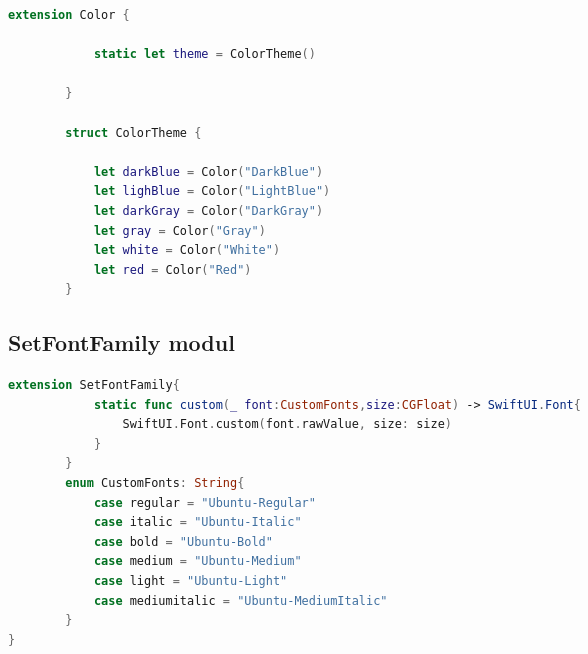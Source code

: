 \begin{spacing}{2}
\end{spacing}
\begin{minipage}{\textwidth}
    \linespread{0.8}\selectfont
    \begin{lstlisting}[language=swift]
        extension Color {
            
            static let theme = ColorTheme()
            
        }

        struct ColorTheme {
            
            let darkBlue = Color("DarkBlue")
            let lighBlue = Color("LightBlue")
            let darkGray = Color("DarkGray")
            let gray = Color("Gray")
            let white = Color("White")
            let red = Color("Red")
        }
    \end{lstlisting}   
\end{minipage}

\subsection*{SetFontFamily modul}

\begin{spacing}{2}
\end{spacing}
\begin{minipage}{\textwidth}
    \linespread{0.8}\selectfont
    \begin{lstlisting}[language=swift]
        extension SetFontFamily{
            static func custom(_ font:CustomFonts,size:CGFloat) -> SwiftUI.Font{
                SwiftUI.Font.custom(font.rawValue, size: size)
            }
        }
        enum CustomFonts: String{
            case regular = "Ubuntu-Regular"
            case italic = "Ubuntu-Italic"
            case bold = "Ubuntu-Bold"
            case medium = "Ubuntu-Medium"
            case light = "Ubuntu-Light"
            case mediumitalic = "Ubuntu-MediumItalic"
        }
}
\end{lstlisting}   
\end{minipage}